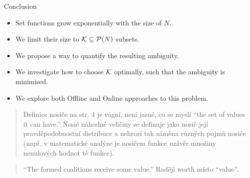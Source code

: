 \documentclass[aspectratio=169]{beamer}
\begin{document}
\begin{frame}{Conclusion}
	\begin{itemize}
		\item  Set functions grow exponentially with the size of $ N $.
		\item We limit their size to $ \mathcal{K} \subseteq \mathcal{P}\!\left(N\right) $ subsets.
		\item We propose a way to quantify the resulting ambiguity.
		\item We investigate how to choose $ \mathcal{K} $ optimally, such that the ambiguity is minimised.
		\item We explore both Offline and Online approaches to this problem.
	\end{itemize}
\end{frame}


\appendix

\begin{frame}{}
	\begin{quote}
		Definice nosiče na str. 4 je vágní, není jasné, co se myslí “the set of values it can have.” Nosič náhodné veličiny se definuje jako nosič její pravděpodobnostní distribuce a nehrozí tak záměna různých pojmů nosiče (např. v matematické analýze je nosičem funkce uzávěr množiny nenulových hodnot té funkce).
	\end{quote}
	
	 
\end{frame}

\begin{frame}
	\begin{quote}
		“The formed coalitions receive some value.” Raději worth místo “value”.
	\end{quote}
\end{frame}
\end{document}
